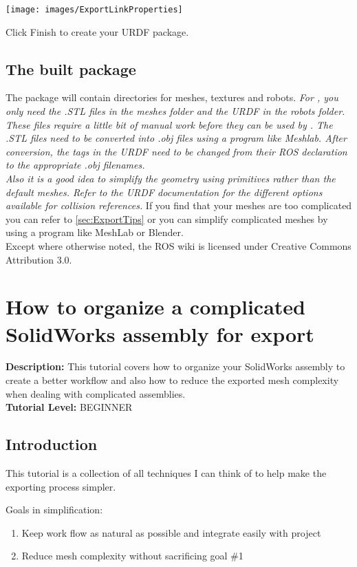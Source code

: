 \texttt{[image: images/ExportLinkProperties]}

Click Finish to create your URDF package.

\subsection{The built package}\label{sec:ExportBuiltPackage}
\indent The package will contain directories for meshes, textures and robots. 
\textit{
For \drake, you only need the .STL files in the meshes folder and the URDF in the robots folder.  These files require a little bit of manual work before they can be used by \drake.  The .STL files need to be converted into .obj files using a program like Meshlab.  After conversion, the  tags in the URDF need to be changed from their ROS declaration to the appropriate .obj filenames.  \\ \indent Also it is a good idea to simplify the  geometry using primitives rather than the default meshes.  Refer to the URDF documentation for the different options available for collision references.
} 
If you find that your meshes are too complicated you can refer to \autoref{sec:ExportTips} or you can simplify complicated meshes by using a program like MeshLab or Blender. 
\\

Except where otherwise noted, the ROS wiki is licensed under Creative Commons Attribution 3.0.

\section{How to organize a complicated SolidWorks assembly for export}\label{sec:ExportTips}
\textbf{Description:} This tutorial covers how to organize your SolidWorks assembly to create a better workflow and also how to reduce the exported mesh complexity when dealing with complicated assemblies.
\\

\noindent \textbf{Tutorial Level:} BEGINNER
\subsection{Introduction}
\noindent This tutorial is a collection of all techniques I can think of to help make the exporting process simpler.
 
\noindent Goals in simplification: 
\begin{enumerate}
\item Keep work flow as natural as possible and integrate easily with project 
\item Reduce mesh complexity without sacrificing goal \#1 
\end{enumerate}

